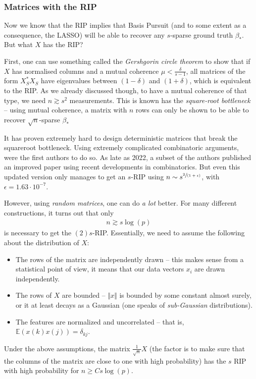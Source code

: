 \documentclass{article}
\newcommand{\norm}[1]{\Vert #1 \Vert}
\begin{document}
\subsubsection{Matrices with the RIP}
Now we know that the RIP implies that Basis Pursuit (and to some extent as a consequence, the LASSO) will be able to recover any $s$-sparse ground truth $\beta_*$. But what $X$ has the RIP?

First, one can use something called the \emph{Gershgorin circle theorem} to show that if $X$ has normalised columns and a mutual coherence $\mu < \tfrac{\delta}{s-1}$, all matrices of the form $X_S^*X_S$  have eigenvalues between $(1-\delta)$ and $(1+\delta)$, which is equivalent to the RIP. As we already discussed though, to have a mutual coherence of that type, we need $n\gtrsim s^2$ measurements. This is known has the \emph{square-root bottleneck} -- using mutual coherence, a matrix with $n$ rows can only be shown to be able to recover $\sqrt{n}$-sparse $\beta_*$

It has proven extremely hard to design deterministic matrices that break the squareroot bottleneck. Using extremely complicated combinatoric arguments, \cite{bourgain2011explicit} were the first authors to do so. As late as 2022, a subset of the authors published an improved paper \cite{ford2022explicit} using recent developments in combinatorics. But even this updated version only manages to get an $s$-RIP using $n\sim s^{\sfrac{2}{(1+\epsilon)}}$, with $\epsilon=1.63\cdot 10^{-7}$.

However, using \emph{random matrices}, one can do \emph{a lot} better. For many different constructions, it turns out that only 
\begin{align*}
    n \gtrsim s\log(p)
\end{align*}
is necessary to get the $(2)s$-RIP. Essentially, we need to assume the following about the distribution of $X$:
\begin{itemize}
    \item The rows of the matrix are independently drawn -- this makes sense from a statistical point of view, it means that our data vectors $x_i$ are drawn independently.
    \item The rows of $X$ are bounded -- $\norm{x}$ is bounded by some constant almost surely, or it at least decays as a Gaussian (one speaks of \emph{sub-Gaussian} distributions).
    \item The features are normalized and uncorrelated -- that is, $\mathbb{E}(x(k)x(j))=\delta_{kj}$.
\end{itemize}
Under the above assumptions, the matrix $\tfrac{1}{\sqrt{n}}X$ (the factor is to make sure that the columns of the matrix are close to one with high probability) has the $s$ RIP with high probability for $n \geq C s\log(p)$.
\end{document}
